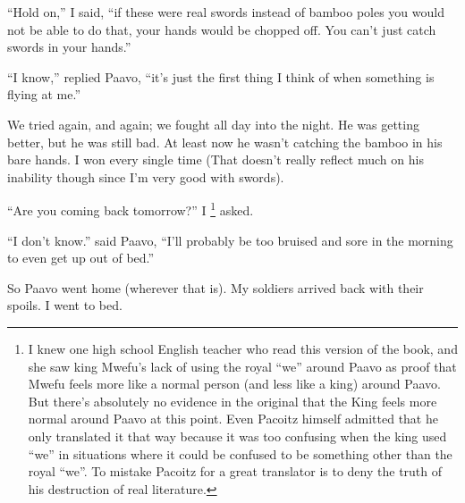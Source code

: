 ``Hold on,'' I said, ``if these were real swords instead of bamboo poles you would not be able to do that, your hands would be chopped off. You can't just catch swords in your hands.''

``I know,'' replied Paavo, ``it's just the first thing I think of when something is flying at me.''

We tried again, and again; we fought all day into the night. He was getting better, but he was still bad. At least now he wasn't catching the bamboo in his bare hands. I won every single time (That doesn't really reflect much on his inability though since I'm very good with swords).

``Are you coming back tomorrow?'' I
\footnote{I knew one high school English teacher who read this version of the book, and she saw king Mwefu's lack of using the royal ``we'' around Paavo as proof that Mwefu feels more like a normal person (and less like a king) around Paavo.
But there's absolutely no evidence in the original that the King feels more normal around Paavo at this point. 
Even Pacoitz himself admitted that he only translated it that way because it was too confusing when the king used ``we'' in situations where it could be confused to be something other than the royal ``we''. To mistake Pacoitz for a great translator is to deny the truth of his destruction of real literature.
} asked.

``I don't know.'' said Paavo, ``I'll probably be too bruised and sore in the morning to even get up out of bed.''

So Paavo went home (wherever that is). My soldiers arrived back with their spoils. I went to bed.


